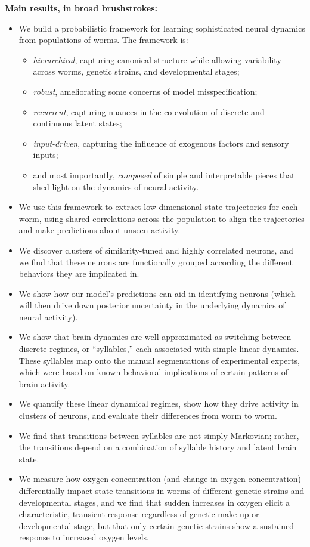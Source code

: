 \documentclass[11pt]{article}
\begin{document}
\textbf{Main results, in broad brushstrokes:}
\begin{itemize}
\item We build a probabilistic framework for learning sophisticated neural dynamics from populations of worms. The framework is:
  \begin{itemize}
  \item \emph{hierarchical}, capturing canonical structure while allowing variability across worms, genetic strains, and developmental stages;
  \item \emph{robust}, ameliorating some concerns of model misspecification;
  \item \emph{recurrent}, capturing nuances in the co-evolution of discrete and continuous latent states;
  \item \emph{input-driven}, capturing the influence of exogenous factors and sensory inputs;
  \item and most importantly, \emph{composed} of simple and interpretable pieces that shed light on the dynamics of neural activity.
  \end{itemize}
\item We use this framework to extract low-dimensional state
  trajectories for each worm, using shared correlations across the
  population to align the trajectories and make predictions about
  unseen activity.
\item We discover clusters of similarity-tuned and highly correlated
  neurons, and we find that these neurons are functionally grouped
  according the different behaviors they are implicated in.
\item We show how our model's predictions can aid in identifying neurons (which will then drive down posterior uncertainty in the underlying dynamics of neural activity).
\item We show that brain dynamics are well-approximated as switching between discrete regimes, or ``syllables,'' each associated with simple linear dynamics.  These syllables map onto the manual segmentations of experimental experts, which were based on known behavioral implications of certain patterns of brain activity.
\item We quantify these linear dynamical regimes, show how they drive activity in clusters of neurons, and evaluate their differences from worm to worm.
\item We find that transitions between syllables are not simply Markovian; rather, the transitions depend on a combination of syllable history and latent brain state.
\item We measure how oxygen concentration (and change in oxygen concentration) differentially impact state transitions in worms of different genetic strains and developmental stages, and we find that sudden increases in oxygen elicit a characteristic, transient response regardless of genetic make-up or developmental stage, but that only certain genetic strains show a sustained response to increased oxygen levels. 
\end{itemize}
\end{document}
